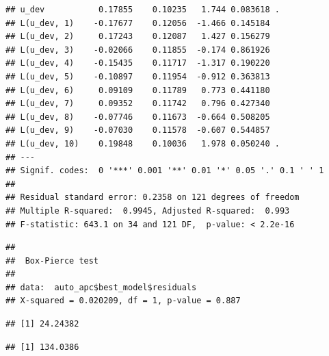 \documentclass[
]{article}
\newenvironment{Shaded}{\begin{snugshade}}{\end{snugshade}}
\newcommand{\KeywordTok}[1]{\textcolor[rgb]{0.13,0.29,0.53}{\textbf{#1}}}
\newcommand{\NormalTok}[1]{#1}
\newcommand{\OperatorTok}[1]{\textcolor[rgb]{0.81,0.36,0.00}{\textbf{#1}}}
\begin{document}
\begin{verbatim}
## u_dev           0.17855    0.10235   1.744 0.083618 .  
## L(u_dev, 1)    -0.17677    0.12056  -1.466 0.145184    
## L(u_dev, 2)     0.17243    0.12087   1.427 0.156279    
## L(u_dev, 3)    -0.02066    0.11855  -0.174 0.861926    
## L(u_dev, 4)    -0.15435    0.11717  -1.317 0.190220    
## L(u_dev, 5)    -0.10897    0.11954  -0.912 0.363813    
## L(u_dev, 6)     0.09109    0.11789   0.773 0.441180    
## L(u_dev, 7)     0.09352    0.11742   0.796 0.427340    
## L(u_dev, 8)    -0.07746    0.11673  -0.664 0.508205    
## L(u_dev, 9)    -0.07030    0.11578  -0.607 0.544857    
## L(u_dev, 10)    0.19848    0.10036   1.978 0.050240 .  
## ---
## Signif. codes:  0 '***' 0.001 '**' 0.01 '*' 0.05 '.' 0.1 ' ' 1
## 
## Residual standard error: 0.2358 on 121 degrees of freedom
## Multiple R-squared:  0.9945, Adjusted R-squared:  0.993 
## F-statistic: 643.1 on 34 and 121 DF,  p-value: < 2.2e-16
\end{verbatim}

\begin{Shaded}
\end{Shaded}

\begin{verbatim}
## 
##  Box-Pierce test
## 
## data:  auto_apc$best_model$residuals
## X-squared = 0.020209, df = 1, p-value = 0.887
\end{verbatim}

\begin{Shaded}
\end{Shaded}

\begin{verbatim}
## [1] 24.24382
\end{verbatim}

\begin{Shaded}
\end{Shaded}

\begin{verbatim}
## [1] 134.0386
\end{verbatim}
\end{document}

